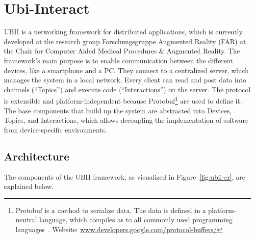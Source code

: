 \section{Ubi-Interact}\label{section:ubi-interact}

\gls{UBII} is a networking framework for distributed applications, which is currently developed at the research group Forschungsgruppe Augmented Reality (FAR) at the Chair for Computer Aided Medical Procedures \& Augmented Reality. The framework's main purpose is to enable communication between the different devices, like a smartphone and a \gls{PC}. They connect to a centralized server, which manages the system in a local network. Every client can read and post data into channels (\enquote{Topics}) and execute code (\enquote{Interactions}) on the server. The protocol is extensible and platform-independent because \gls{Protobuf}\footnote{Protobuf is a method to serialize data. The data is defined in a platform-neutral language, which compiles as to all commonly used programming languages~\cite{GoogleLLC.2019b}. Website: \href{https://developers.google.com/protocol-buffers/}{www.developers.google.com/protocol-buffers/}} are used to define it. The base components that build up the system are abstracted into Devices, Topics, and Interactions, which allows decoupling the implementation of software from device-specific environments.


\subsection{Architecture}\label{subsection:architecture}

The components of the \gls{UBII} framework, as visualized in Figure~\ref{fig:ubii-er}, are explained below.

